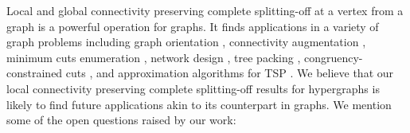 \documentclass{article}
\begin{document}
Local and global connectivity preserving complete splitting-off at a vertex from a graph is a powerful operation for graphs. It finds applications in a variety of graph problems including graph orientation \cite{Mad78, Frank93:Applications-of-submod-functions, FK02, Kiraly-Lau}, connectivity augmentation \cite{Fra92, Fra94, JFJ95, Frank-book, nagamochi_ibaraki_2008_book}, 
minimum cuts enumeration \cite{NNI97, HW96, Goe01}, network design \cite{Lov76, Jor03, CS08, CFLY11}, tree packing \cite{BHTP03, Kri03, JMS03, Lau07}, congruency-constrained cuts \cite{NZ20}, and approximation algorithms for TSP \cite{GB93, BN23}. 
We believe that our local connectivity preserving complete splitting-off results for hypergraphs is likely to find future applications akin to its counterpart in graphs. 
We mention some of the open questions raised by our work:
\end{document}
